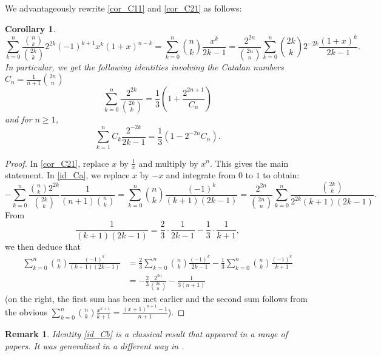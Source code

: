 \documentclass[11pt,reqno]{amsart}
\theoremstyle{plain}
\numberwithin{equation}{section}
\newtheorem{corollary}[thm]{Corollary}
\newtheorem{remark}[thm]{Remark}
\begin{document}
We advantageously rewrite \eqref{cor_C11} and \eqref{cor_C21} as follows:

\begin{corollary}
\begin{equation}\label{id_Ca}
\sum_{k=0}^n\frac{\binom{n}{k}}{\binom{2k}{k}}2^{2k}(-1)^{k+1} x^k (1+x)^{n-k} = \sum_{k=0}^n\binom{n}{k}\frac{x^k}{2k-1}
=\frac{2^{2n}}{\binom{2n}{n}}\sum_{k=0}^n\binom{2k}{k} 2^{-2k}\frac{(1+x)^{k}}{2k-1}.
\end{equation}
In particular, we get the following identities involving the Catalan numbers $C_n=\frac{1}{n+1}\binom{2n}{n}$
\begin{equation}\label{id_Cb}
\sum_{k=0}^n \frac{2^{2k}}{\binom{2k}{k}} = \frac{1}{3} \left(1+\frac{2^{2n+1}}{C_n} \right)
\end{equation}
and for $n\ge 1$,
\begin{equation}\label{id_Cc}
\sum_{k=1}^n C_k \frac{2^{-2k}}{2k-1} = \frac{1}{3}\left( 1 - 2^{-2n} C_n \right).
\end{equation}
\end{corollary}
\begin{proof}
In \eqref{cor_C21}, replace $x$ by $\frac{1}{x}$ and multiply by $x^n$. This gives the main statement. In \eqref{id_Ca}, we replace $x$ by $-x$ and integrate from $0$ to $1$ to obtain:
\begin{equation*}%
-\sum_{k=0}^n \frac{\binom{n}{k}2^{2k}}{\binom{2k}{k}}\frac{1}{(n+1)\binom{n}{k}}
= \sum_{k=0}^n\binom{n}{k}\frac{(-1)^k}{(k+1)(2k-1)} = \frac{2^{2n}}{\binom{2n}{n}}\sum_{k=0}^n\frac{\binom{2k}{k}}{2^{2k}(k+1)(2k-1)}.
\end{equation*}
From 
$$\frac{1}{(k+1)(2k-1)} = \frac{2}{3}\cdot\frac{1}{2k-1} - \frac{1}{3}\cdot\frac{1}{k+1},$$ 
we then deduce that
\begin{align*}
\sum_{k=0}^n\binom{n}{k}\frac{(-1)^k}{(k+1)(2k-1)} &= \frac{2}{3}\sum_{k=0}^n\binom{n}{k}\frac{(-1)^k}{2k-1}-\frac{1}{3}\sum_{k=0}^n\binom{n}{k}\frac{(-1)^k}{k+1} \\
&= -\frac{2}{3}\frac{2^{2n}}{\binom{2n}{n}}-\frac{1}{3(n+1)}
\end{align*}
(on the right, the first sum has been met earlier and the second sum follows from the obvious $\sum_{k=0}^n\binom{n}{k}\frac{x^{k+1}}{k+1}=\frac{(x+1)^{n+1}-1}{n+1}$).
\end{proof}

\begin{remark}
Identity \eqref{id_Cb} is a classical result that appeared in a range of papers. It was generalized in a different way in \cite{Bataille2}.
\end{remark}
\end{document}
